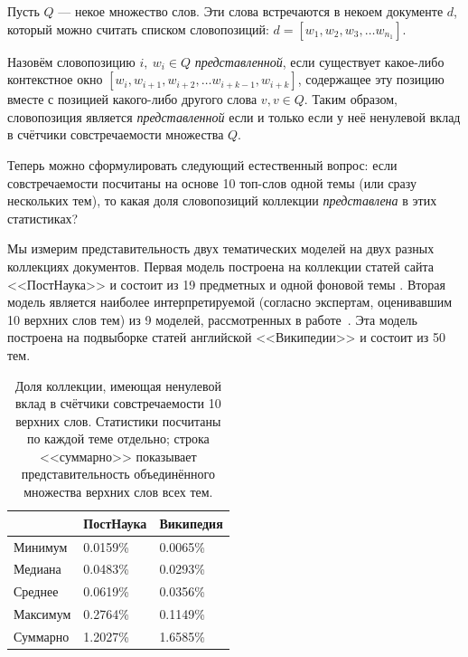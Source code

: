 Пусть $Q$ --- некое множество слов. Эти слова встречаются в некоем документе $d$, который можно считать списком словопозиций: $d = [w_1, w_2, w_3, \dots w_{n_1}]$.

Назовём словопозицию $i, ~w_i \in Q$ \textit{представленной}, если существует какое-либо контекстное окно $[w_i, w_{i+1}, w_{i+2}, \dots w_{i+k-1}, w_{i+k}]$, содержащее эту позицию вместе с позицией какого-либо другого слова $v, v \in Q$. Таким образом, словопозиция является \textit{представленной} если и только если у неё ненулевой вклад в счётчики совстречаемости множества $Q$.

Теперь можно сформулировать следующий естественный вопрос: если совстречаемости посчитаны на основе 10 топ-слов одной темы (или сразу нескольких тем), то какая доля словопозиций коллекции \textit{представлена} в этих статистиках?




Мы измерим представительность двух тематических моделей на двух разных коллекциях документов. Первая модель построена на коллекции статей сайта <<ПостНаука>> и состоит из 19 предметных и одной фоновой темы \cite{irina}. Вторая модель является наиболее интерпретируемой (согласно экспертам, оценивавшим 10 верхних слов тем) из 9 моделей, рассмотренных в работе~\cite{rtl}. Эта модель построена на подвыборке статей английской <<Википедии>> и состоит из 50 тем.

\begin{table}[ht]
\begin{tabular}{|l|l|l|} \hline
         & ПостНаука & Википедия \\ \hline
Минимум  & 0.0159\%  & 0.0065\%  \\ \hline
Медиана  & 0.0483\%  & 0.0293\%  \\ \hline
Среднее  & 0.0619\%  & 0.0356\%  \\ \hline
Максимум & 0.2764\%  & 0.1149\%  \\ \hline
Суммарно & 1.2027\%  & 1.6585\%  \\ \hline
\end{tabular}
    \caption{
      Доля коллекции, имеющая ненулевой вклад в счётчики совстречаемости 10 верхних слов. Статистики посчитаны по каждой теме отдельно; строка <<суммарно>> показывает представительность объединённого множества верхних слов всех тем.
    }
    \label{table:represented}
\end{table}

